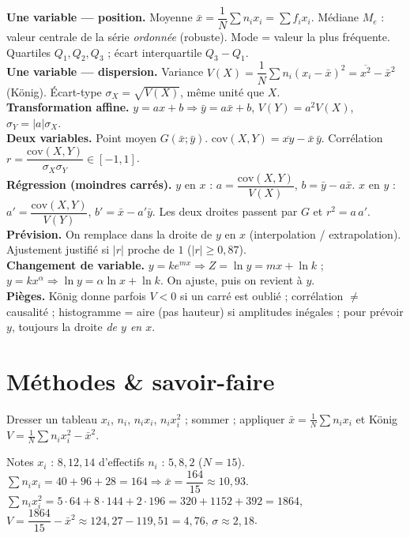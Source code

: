 \begin{synthese}
\textbf{Une variable — position.} Moyenne $\bar x=\dfrac1N\sum n_i x_i=\sum f_i x_i$.
Médiane $M_e$ : valeur centrale de la série \emph{ordonnée} (robuste). Mode = valeur la
plus fréquente. Quartiles $Q_1,Q_2,Q_3$ ; écart interquartile $Q_3-Q_1$.\\[4pt]
\textbf{Une variable — dispersion.} Variance $V(X)=\dfrac1N\sum n_i(x_i-\bar x)^2
=\overline{x^2}-\bar x^2$ (König). Écart-type $\sigma_X=\sqrt{V(X)}$, même unité que $X$.\\[4pt]
\textbf{Transformation affine.} $y=ax+b\Rightarrow \bar y=a\bar x+b$, $V(Y)=a^2V(X)$,
$\sigma_Y=|a|\sigma_X$.\\[4pt]
\textbf{Deux variables.} Point moyen $G(\bar x;\bar y)$.
$\mathrm{cov}(X,Y)=\overline{xy}-\bar x\,\bar y$.
Corrélation $r=\dfrac{\mathrm{cov}(X,Y)}{\sigma_X\sigma_Y}\in[-1,1]$.\\[4pt]
\textbf{Régression (moindres carrés).} $y$ en $x$ : $a=\dfrac{\mathrm{cov}(X,Y)}{V(X)}$,
$b=\bar y-a\bar x$. $x$ en $y$ : $a'=\dfrac{\mathrm{cov}(X,Y)}{V(Y)}$, $b'=\bar x-a'\bar y$.
Les deux droites passent par $G$ et $r^2=a\,a'$.\\[4pt]
\textbf{Prévision.} On remplace dans la droite de $y$ en $x$ (interpolation /
extrapolation). Ajustement justifié si $|r|$ proche de $1$ ($|r|\ge0{,}87$).\\[4pt]
\textbf{Changement de variable.} $y=ke^{mx}\Rightarrow Z=\ln y=mx+\ln k$ ;
$y=kx^\alpha\Rightarrow \ln y=\alpha\ln x+\ln k$. On ajuste, puis on revient à $y$.\\[4pt]
\textbf{Pièges.} König donne parfois $V<0$ si un carré est oublié ; corrélation $\ne$
causalité ; histogramme = aire (pas hauteur) si amplitudes inégales ; pour prévoir $y$,
toujours la droite \emph{de $y$ en $x$}.
\end{synthese}

\section{Méthodes \& savoir-faire}

Dresser un tableau $x_i$, $n_i$, $n_ix_i$, $n_ix_i^2$ ; sommer ; appliquer
$\bar x=\frac1N\sum n_ix_i$ et König $V=\frac1N\sum n_ix_i^2-\bar x^2$.
\begin{exemple}
Notes $x_i$ : $8,12,14$ d'effectifs $n_i$ : $5,8,2$ ($N=15$).
$\sum n_ix_i=40+96+28=164\Rightarrow\bar x=\dfrac{164}{15}\approx10{,}93$.
$\sum n_ix_i^2=5\!\cdot\!64+8\!\cdot\!144+2\!\cdot\!196=320+1152+392=1864$,
$V=\dfrac{1864}{15}-\bar x^2\approx124{,}27-119{,}51=4{,}76$, $\sigma\approx2{,}18$.
\end{exemple}

